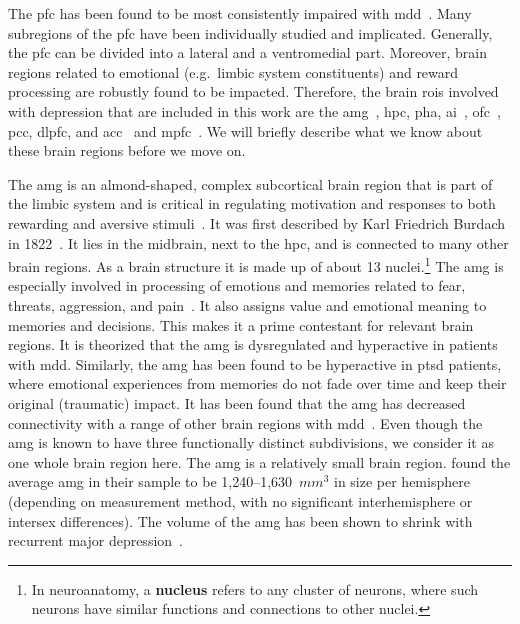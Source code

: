The \gls{pfc} has been found to be most consistently impaired with \gls{mdd}~\parencite{George1994, Pizzagalli2021}.
Many subregions of the \gls{pfc} have been individually studied and implicated.
Generally, the \gls{pfc} can be divided into a lateral and a ventromedial part.
Moreover, brain regions related to emotional (e.g.~limbic system constituents) and reward processing are robustly found to be impacted.
Therefore, the brain \glspl{roi} involved with depression that are included in this work are the \gls{amg}~\parencite{Dannlowski2009, Kong2013, Connolly2017, Zhang2020}, \gls{hpc}, \gls{pha}, \gls{ai}~\parencite{Avery2014, Kandilarova2018}, \gls{ofc}~\parencite{Rolls2020}, \gls{pcc}, \gls{dlpfc}, and \gls{acc}~\parencite{Drevets2008} and \gls{mpfc}~\parencite{Pizzagalli2021}.
We will briefly describe what we know about these brain regions before we move on.

The \gls{amg} is an almond-shaped, complex subcortical brain region that is part of the limbic system and is critical in regulating motivation and responses to both rewarding and aversive stimuli~\parencite{Nestler2002}.
It was first described by Karl Friedrich Burdach in 1822~\parencite{Burdach1826}.
It lies in the midbrain, next to the \gls{hpc}, and is connected to many other brain regions.
As a brain structure it is made up of about 13 nuclei.\footnote{In neuroanatomy, a \textbf{nucleus} refers to any cluster of neurons, where such neurons have similar functions and connections to other nuclei.}
The \gls{amg} is especially involved in processing of emotions and memories related to fear, threats, aggression, and pain~\parencite{Thompson2017b}.
It also assigns value and emotional meaning to memories and decisions.
This makes it a prime contestant for relevant brain regions.
It is theorized that the \gls{amg} is dysregulated and hyperactive in patients with \gls{mdd}.
Similarly, the \gls{amg} has been found to be hyperactive in \gls{ptsd} patients, where emotional experiences from memories do not fade over time and keep their original (traumatic) impact.
It has been found that the \gls{amg} has decreased connectivity with a range of other brain regions with \gls{mdd}~\parencite{Tang2013, Ramasubbu2014}.
Even though the \gls{amg} is known to have three functionally distinct subdivisions, we consider it as one whole brain region here.
The \gls{amg} is a relatively small brain region.
\textcite{Brabec2010} found the average \gls{amg} in their sample to be 1,240--1,630~$mm^3$ in size per hemisphere (depending on measurement method, with no significant interhemisphere or intersex differences).
The volume of the \gls{amg} has been shown to shrink with recurrent major depression~\parencite{Sheline1998}.


